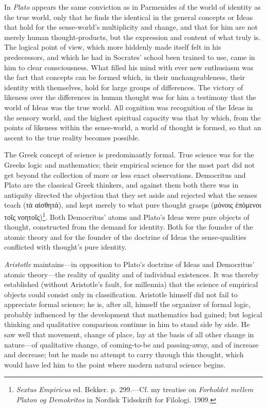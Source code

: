 \documentclass[12pt,a4paper]{book}
\newcommand{\opage}[1]{\marginnote{\footnotesize\textit{[#1]}}}
\begin{document}
In \emph{Plato} appears the same conviction as in Parmenides of the world
of identity as the true world, only that he finds the identical in the
general concepts or Ideas that hold for the sense-world's multiplicity and
change, and that for him are not merely human thought-products, but the
expression and content of what truly is. The logical point of view, which
more hiddenly made itself felt in his predecessors, and which he had in
Socrates' school been trained to use, came in him to clear consciousness.
What filled his mind with ever new enthusiasm was the fact that concepts
can be formed which, in their unchangeableness, their identity with
themselves, hold for large groups of differences. The victory of likeness
over the differences in human thought was for him a testimony that the
world of Ideas was the true world. All cognition was recognition of the
Ideas in the sensory world, and the highest spiritual capacity was that by
which, from the points of likeness within the sense-world, a world of
thought is formed, so that an ascent to the true reality becomes possible.

The Greek concept of science is predominantly formal. True science was for
the Greeks logic and mathematics; their empirical science for the most part
did not get beyond the collection of more or less exact observations.
\opage{126}Democritus and Plato are the classical Greek thinkers, and against them
both there was in antiquity directed the objection that they set aside and
rejected what the senses teach (τὰ αἰσθητά), and kept merely to what pure
thought grasps (μόνοις ἑπόμενοι τοῖς νοητοῖς)\footnote{\emph{Sextus
Empiricus} ed. Bekker. p. 299.---Cf. my treatise on \emph{Forholdet mellem
Platon og Demokritos} in Nordisk Tidsskrift for Filologi. 1909.}. Both
Democritus' atoms and Plato's Ideas were pure objects of thought,
constructed from the demand for identity. Both for the founder of the
atomic theory and for the founder of the doctrine of Ideas the
sense-qualities conflicted with thought's pure identity.

\emph{Aristotle} maintains---in opposition to Plato's doctrine of Ideas and
Democritus' atomic theory---the reality of quality and of individual
existences. It was thereby established (without Aristotle's fault, for
millennia) that the science of empirical objects could consist only in
classification. Aristotle himself did not fail to appreciate formal
science; he is, after all, himself the organizer of formal logic, probably
influenced by the development that mathematics had gained; but logical
thinking and qualitative comparison continue in him to stand side by side.
He saw well that movement, change of place, lay at the basis of all other
change in nature---of qualitative change, of coming-to-be and
passing-away, and of increase and decrease; but he made no attempt to carry
through this thought, which would have led him to the point where modern
natural science begins.
\end{document}
